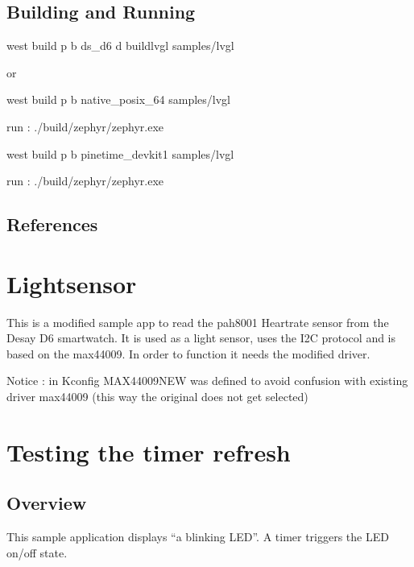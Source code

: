 \documentclass[letterpaper,10pt,english]{sphinxmanual}
\begin{document}
\subsection{Building and Running}
\label{\detokenize{samples/appsampleslvglREADME:building-and-running}}
west build \sphinxhyphen{}p \sphinxhyphen{}b ds\_d6 \sphinxhyphen{}d build\sphinxhyphen{}lvgl samples/lvgl

or

west build \sphinxhyphen{}p \sphinxhyphen{}b native\_posix\_64 samples/lvgl

run : ./build/zephyr/zephyr.exe

west build \sphinxhyphen{}p \sphinxhyphen{}b pinetime\_devkit1 samples/lvgl

run : ./build/zephyr/zephyr.exe


\subsection{References}
\label{\detokenize{samples/appsampleslvglREADME:references}}

\section{Lightsensor}
\label{\detokenize{samples/appsamplesmax44009README:lightsensor}}\label{\detokenize{samples/appsamplesmax44009README::doc}}
This is a modified sample app to read the pah8001 Heartrate sensor from the Desay D6 smartwatch.
It is used as a light sensor, uses the I2C protocol and is based on the max44009.
In order to function it needs the modified driver.

Notice :  in Kconfig MAX44009NEW was defined to avoid confusion with existing driver max44009
(this way the original does not get selected)


\section{Testing the timer refresh}
\label{\detokenize{samples/appsamplestimerREADME:testing-the-timer-refresh}}\label{\detokenize{samples/appsamplestimerREADME:sdl-sample}}\label{\detokenize{samples/appsamplestimerREADME::doc}}

\subsection{Overview}
\label{\detokenize{samples/appsamplestimerREADME:overview}}
This sample application displays “a blinking LED”.
A timer triggers the LED on/off state.
\end{document}
